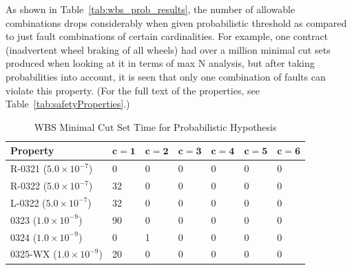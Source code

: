 As shown in Table~\ref{tab:wbs_prob_results}, the number of allowable combinations drops considerably when given probabilistic threshold as compared to just fault combinations of certain cardinalities. For example, one contract (inadvertent wheel braking of all wheels) had over a million minimal cut sets produced when looking at it in terms of max N analysis, but after taking probabilities into account, it is seen that only one combination of faults can violate this property. (For the full text of the properties, see Table~\ref{tab:safetyProperties}.)

\begin{center}
\begin{table}[htbp]
    \begin{tabular}{ | l | l | l | l | l | l | l | }
    \hline
    \textbf{Property} & $\bm{c = 1}$ & $\bm{c = 2}$ & $\bm{c = 3}$ & $\bm{c = 4}$ & $\bm{c = 5}$ & $\bm{c = 6}$   \\ \hline \hline
    R-0321 ($5.0 \times 10^{-7}$) & 0 & 0 & 0 & 0 & 0 & 0  \\ \hline
    R-0322 ($5.0 \times 10^{-7}$)  & 32 & 0 & 0 &0 &0 &0  \\ \hline
    L-0322 ($5.0 \times 10^{-7}$)  & 32 & 0 & 0 & 0 & 0 & 0   \\ \hline
    0323 ($1.0 \times 10^{-9}$)  & 90 & 0 & 0 & 0 & 0 & 0   \\ \hline
    0324 ($1.0 \times 10^{-9}$) & 0 & 1 & 0 & 0 & 0 & 0  \\ \hline
    0325-WX ($1.0 \times 10^{-9}$) & 20 & 0 & 0 &0 &0 & 0   \\ \hline
    \end{tabular}
    \caption{WBS Minimal Cut Set Time for Probabilistic Hypothesis}
    \label{tab:analysisTimeWBSProb}
\end{table}
\end{center}

